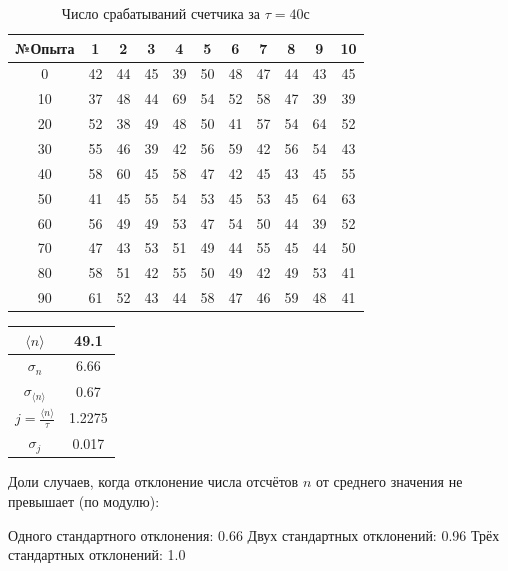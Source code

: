 \documentclass[a4paper, 12pt]{article}
\begin{document}
\begin{table}[!h]
\begin{center}
\begin{tabular}{|c|c|c|c|c|c|c|c|c|c|c|}
\hline
№Опыта & 1 & 2 & 3 & 4 & 5 & 6 & 7 & 8 & 9 & 10 \\ \hline
0 & 42 & 44 & 45 & 39 & 50 & 48 & 47 & 44 & 43 & 45 \\ \hline
10 & 37 & 48 & 44 & 69 & 54 & 52 & 58 & 47 & 39 & 39 \\ \hline
20 & 52 & 38 & 49 & 48 & 50 & 41 & 57 & 54 & 64 & 52 \\ \hline
30 & 55 & 46 & 39 & 42 & 56 & 59 & 42 & 56 & 54 & 43 \\ \hline
40 & 58 & 60 & 45 & 58 & 47 & 42 & 45 & 43 & 45 & 55 \\ \hline
50 & 41 & 45 & 55 & 54 & 53 & 45 & 53 & 45 & 64 & 63 \\ \hline
60 & 56 & 49 & 49 & 53 & 47 & 54 & 50 & 44 & 39 & 52 \\ \hline
70 & 47 & 43 & 53 & 51 & 49 & 44 & 55 & 45 & 44 & 50 \\ \hline
80 & 58 & 51 & 42 & 55 & 50 & 49 & 42 & 49 & 53 & 41 \\ \hline
90 & 61 & 52 & 43 & 44 & 58 & 47 & 46 & 59 & 48 & 41 \\ \hline
\end{tabular}
\caption*{Число срабатываний счетчика за $\tau = 40$с}
\end{center}
\end{table}

\begin{table}[!h]
\begin{center}
\begin{tabular}{|c|c|}
\hline
$\langle n\rangle$ & 49.1 \\ \hline
$\sigma_{n}$ & 6.66 \\ \hline
$\sigma_{\langle n\rangle}$ & 0.67 \\ \hline
$j=\frac{\langle n\rangle}{\tau}$ & 1.2275 \\ \hline
$\sigma_{j}$ & 0.017 \\ \hline
\end{tabular}
\end{center}
\end{table}

Доли случаев, когда отклонение числа отсчётов $n$ от среднего значения не превышает (по модулю):

Одного стандартного отклонения: 0.66
Двух стандартных отклонений: 0.96
Трёх стандартных отклонений: 1.0
\end{document}
